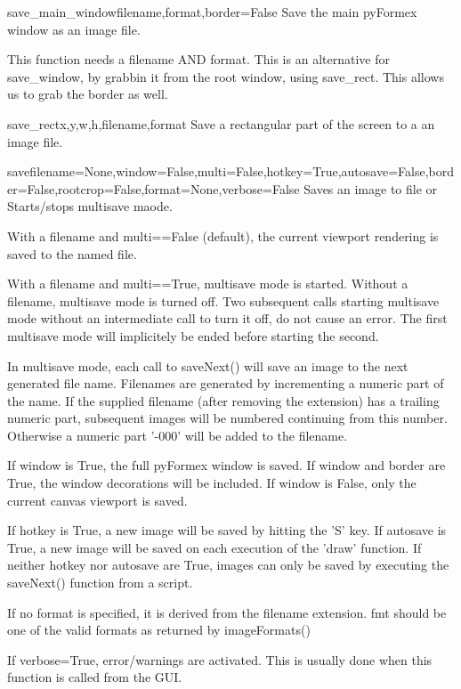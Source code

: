 \begin{funcdesc}{save_main_window}{filename,format,border=False}
Save the main pyFormex window as an image file.

    This function needs a filename AND format.
    This is an alternative for save_window, by grabbin it from the root
    window, using save_rect.
    This allows us to grab the border as well.
    

\end{funcdesc}


\begin{funcdesc}{save_rect}{x,y,w,h,filename,format}
Save a rectangular part of the screen to a an image file.

\end{funcdesc}


\begin{funcdesc}{save}{filename=None,window=False,multi=False,hotkey=True,autosave=False,border=False,rootcrop=False,format=None,verbose=False}
Saves an image to file or Starts/stops multisave maode.

    With a filename and multi==False (default), the current viewport rendering
    is saved to the named file.

    With a filename and multi==True, multisave mode is started.
    Without a filename, multisave mode is turned off.
    Two subsequent calls starting multisave mode without an intermediate call
    to turn it off, do not cause an error. The first multisave mode will
    implicitely be ended before starting the second.

    In multisave mode, each call to saveNext() will save an image to the
    next generated file name.
    Filenames are generated by incrementing a numeric part of the name.
    If the supplied filename (after removing the extension) has a trailing
    numeric part, subsequent images will be numbered continuing from this
    number. Otherwise a numeric part '-000' will be added to the filename.
    
    If window is True, the full pyFormex window is saved.
    If window and border are True, the window decorations will be included.
    If window is False, only the current canvas viewport is saved.

    If hotkey is True, a new image will be saved by hitting the 'S' key.
    If autosave is True, a new image will be saved on each execution of
    the 'draw' function.
    If neither hotkey nor autosave are True, images can only be saved by
    executing the saveNext() function from a script.

    If no format is specified, it is derived from the filename extension.
    fmt should be one of the valid formats as returned by imageFormats()
  
    If verbose=True, error/warnings are activated. This is usually done when
    this function is called from the GUI.
    
    

\end{funcdesc}


